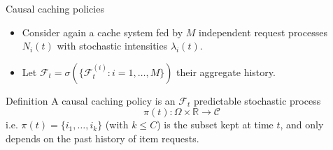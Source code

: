 \documentclass[aspectratio=169]{beamer}
\newenvironment*{myitem}[1][1.5em]{\begin{itemize}\setlength{\itemsep}{#1}}{\end{itemize}}
\begin{document}





		


\begin{frame}{Causal caching policies}
	
	\begin{myitem}[1em]
		\item Consider again a cache system fed by $M$ \alert{independent} request processes $N_i(t)$ with stochastic intensities $\lambda_i(t)$.
		\item Let $\mathcal{F}_t = \sigma(\{\mathcal{F}_t^{(i)}: i=1,\ldots,M\})$ their aggregate history.
	\end{myitem}

	\vfill

	\begin{block}{Definition}
		A \alert{causal} caching policy is an $\mathcal{F}_t$ \alert{predictable} stochastic process
		\begin{equation*}
			\pi(t):\Omega\times\mathbb{R} \to \mathcal{C}
		\end{equation*}
		i.e. $\pi(t) = \{i_1,\ldots,i_k\}$ (with $k\leqslant C$) is the subset kept at time $t$, and only depends on the past history of item requests.
	\end{block}

\end{frame}
\end{document}
